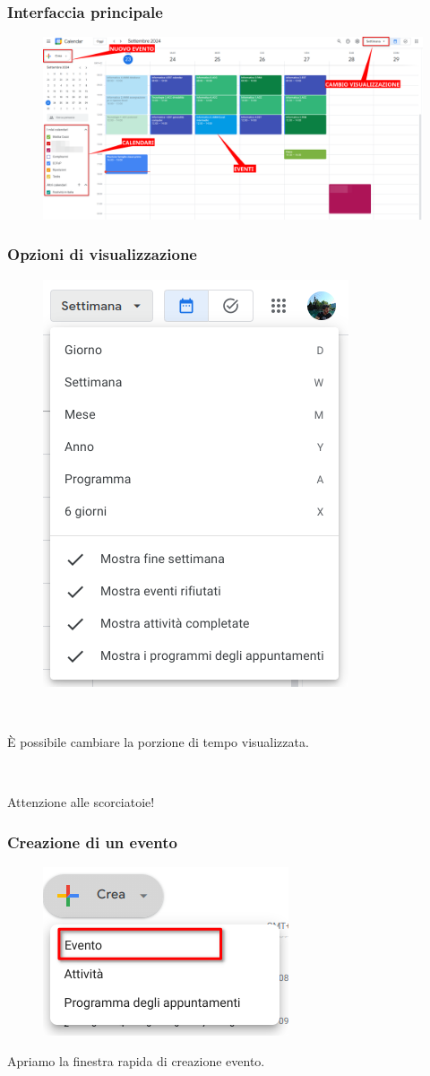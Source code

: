 \documentclass[]{beamer}
\begin{document}
\begin{frame}
\frametitle{Interfaccia principale}
\begin{figure}
  \includegraphics[width=\columnwidth]{img/calendar1.png}
\end{figure}
\end{frame}

\begin{frame}
\frametitle{Opzioni di visualizzazione}
\begin{figure}
  \includegraphics[width=.35\columnwidth]{img/calendarvisua.png}
\end{figure}

~

È possibile cambiare la porzione di tempo visualizzata.\pause

~

Attenzione alle scorciatoie!
\end{frame}


\begin{frame}
\frametitle{Creazione di un evento}
\begin{figure}
  \includegraphics[width=.3\columnwidth]{img/calendarcrea.png}
\end{figure}
Apriamo la \alert{finestra rapida} di creazione evento.
\end{frame}
\end{document}
